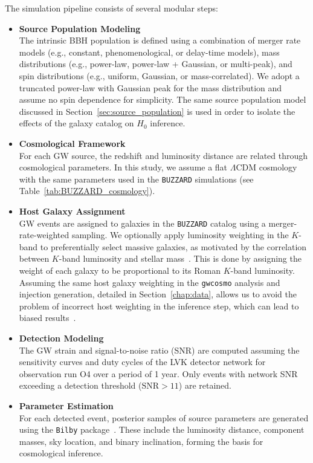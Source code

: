 The simulation pipeline consists of several modular steps:
\begin{itemize}
    \item \textbf{Source Population Modeling}\\
    The intrinsic \ac{BBH} population is defined using a combination of merger rate models (e.g., constant, phenomenological, or delay-time models), mass distributions (e.g., power-law, power-law + Gaussian, or multi-peak), and spin distributions (e.g., uniform, Gaussian, or mass-correlated). We adopt a truncated power-law with Gaussian peak for the mass distribution and assume no spin dependence for simplicity. The same source population model discussed in Section~\ref{sec:source_population} is used in order to isolate the effects of the galaxy catalog on $H_0$ inference.

    \item \textbf{Cosmological Framework}\\
    For each \ac{GW} source, the redshift and luminosity distance are related through cosmological parameters. In this study, we assume a flat $\Lambda$CDM cosmology with the same parameters used in the \texttt{BUZZARD} simulations (see Table~\ref{tab:BUZZARD_cosmology}).

    \item \textbf{Host Galaxy Assignment}\\
    \ac{GW} events are assigned to galaxies in the \texttt{BUZZARD} catalog using a merger-rate-weighted sampling. We optionally apply luminosity weighting in the $K$-band to preferentially select massive galaxies, as motivated by the correlation between $K$-band luminosity and stellar mass~\citep{strazzullo2006near,sureshkumar2021galaxy}. This is done by assigning the weight of each galaxy to be proportional to its Roman $K$-band luminosity. Assuming the same host galaxy weighting in the \texttt{gwcosmo} analysis and injection generation, detailed in Section~\ref{chap:data}, allows us to avoid the problem of incorrect host weighting in the inference step, which can lead to biased results~\citep{perna2024investigating, hanselman2025gravitational}.

    \item \textbf{Detection Modeling}\\
    The \ac{GW} strain and signal-to-noise ratio (SNR) are computed assuming the sensitivity curves and duty cycles of the \ac{LVK} detector network for observation run O4 over a period of 1 year. Only events with network SNR exceeding a detection threshold ($\mathrm{SNR} > 11$) are retained.

    \item \textbf{Parameter Estimation}\\
    For each detected event, posterior samples of source parameters are generated using the \texttt{Bilby} package~\citep{bilby_paper,bilby_mcmc_paper}. These include the luminosity distance, component masses, sky location, and binary inclination, forming the basis for cosmological inference.
\end{itemize}

